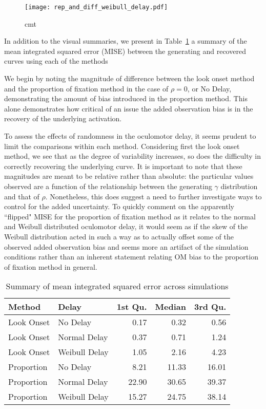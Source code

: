 \begin{figure}[H]
\centering
\texttt{[image: rep\_and\_diff\_weibull\_delay.pdf]}
\caption{cmt}
\label{fig:panel_weibull_delay}
\end{figure}



In addition to the visual summaries, we present in Table~\ref{tab:mise_sims} a summary of the mean integrated squared error (MISE) between the generating and recovered curves using each of the methods

We begin by noting the  magnitude of difference between the look onset method and the proportion of fixation method in the case of $\rho = 0$, or No Delay, demonstrating the amount of bias introduced in the proportion method. This alone demonstrates how critical of an issue the added observation bias is in the recovery of the underlying activation.

To assess the effects of randomness in the oculomotor delay, it seems prudent to limit the comparisons within each method. Considering first the look onset method, we see that as the degree of variability increases, so does the difficulty in correctly recovering the underlying curve. It is important to note that these magnitudes are meant to be relative rather than absolute: the particular values observed are a function of the relationship between the generating $\gamma$ distribution and that of $\rho$. Nonetheless, this does suggest a need to further investigate ways to control for the added uncertainty. To quickly comment on the apparently ``flipped" MISE for the proportion of fixation method as it relates to the normal and Weibull distributed oculomotor delay, it would seem as if the skew of the Weibull distribution acted in such a way as to actually offset some of the observed added observation bias and seems more an artifact of the simulation conditions rather than an inherent statement relating OM bias to the proportion of fixation method in general.

\begin{table}[H]
\centering
\begin{tabular}{llrrr}
  \hline
Method & Delay & 1st Qu. & Median & 3rd Qu. \\ 
  \hline
Look Onset & No Delay & 0.17 & 0.32 & 0.56 \\ 
  Look Onset & Normal Delay & 0.37 & 0.71 & 1.24 \\ 
  Look Onset & Weibull Delay & 1.05 & 2.16 & 4.23 \\ 
  Proportion & No Delay & 8.21 & 11.33 & 16.01 \\ 
  Proportion & Normal Delay & 22.90 & 30.65 & 39.37 \\ 
  Proportion & Weibull Delay & 15.27 & 24.75 & 38.14 \\ 
   \hline
\end{tabular}
\caption{Summary of mean integrated squared error across simulations}
\label{tab:mise_sims}
\end{table}

